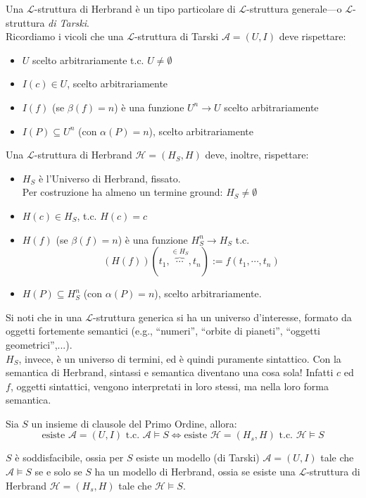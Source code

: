 \begin{defi}
  Una $\mathscr{L}$-struttura di Herbrand è un tipo particolare di $\mathscr{L}$-struttura generale—o $\mathscr{L}$-struttura \textit{di Tarski}. \\
  Ricordiamo i vicoli che una $\mathscr{L}$-struttura di Tarski $\mathscr{A} = (U,I)$ deve rispettare:
  \begin{itemize}
    \item $U$ scelto arbitrariamente t.c. $U \neq \emptyset$
    \item $I(c) \in U$, scelto arbitrariamente
    \item $I(f)$ (se $\beta(f) = n$) è una funzione $U^n \rightarrow U$ scelto arbitrariamente
    \item $I(P) \subseteq U^n$ (con $\alpha(P) = n$), scelto arbitrariamente
  \end{itemize}
  Una $\mathscr{L}$-struttura di Herbrand $\mathscr{H} = (H_S, H)$ deve, inoltre, rispettare: 
  \begin{itemize}
    \item $H_S$ è l'Universo di Herbrand, fissato. \\
    Per costruzione ha almeno un termine ground: $H_S \neq \emptyset$
    \item $H(c) \in H_S$, t.c. $H(c) = c$
    \item $H(f)$ (se $\beta(f) = n$) è una funzione $H_S^n \rightarrow H_S$ t.c.
    $$
    (H(f))(t_1, \overbrace{\cdots}^{\in H_S}, t_n) := f(t_1, \cdots, t_n)
    $$
    \item $H(P) \subseteq H_S^n$ (con $\alpha(P) = n$), scelto arbitrariamente.
  \end{itemize}
\end{defi}
Si noti che in una $\mathscr{L}$-struttura generica si ha un universo d'interesse, formato da oggetti fortemente semantici (e.g., ``numeri'', ``orbite di pianeti'', ``oggetti geometrici'',...). \\
$H_S$, invece, è un universo di termini, ed è quindi puramente sintattico. Con la semantica di Herbrand, sintassi e semantica diventano una cosa sola! Infatti $c$ ed $f$, oggetti sintattici, vengono interpretati in loro stessi, ma nella loro forma semantica.

\begin{teon}
\label{thm:fondamentale-herbrand}
  Sia $S$ un insieme di clausole del Primo Ordine, allora:
  $$
  \text{esiste } \mathscr{A} = (U,I) \text{ t.c. } \mathscr{A} \models S \iff
  \text{esiste } \mathscr{H}=(H_s, H) \text{ t.c. } \mathscr{H} \models S
  $$
\end{teon}
\noindent
$S$ è soddisfacibile, ossia per $S$ esiste un modello (di Tarski) $\mathscr{A} = (U,I)$ tale che $\mathscr{A} \models S$ se e solo se $S$ ha un modello di Herbrand, ossia se esiste una $\mathscr{L}$-struttura di Herbrand $\mathscr{H}=(H_s, H)$ tale che $\mathscr{H} \models S$.


